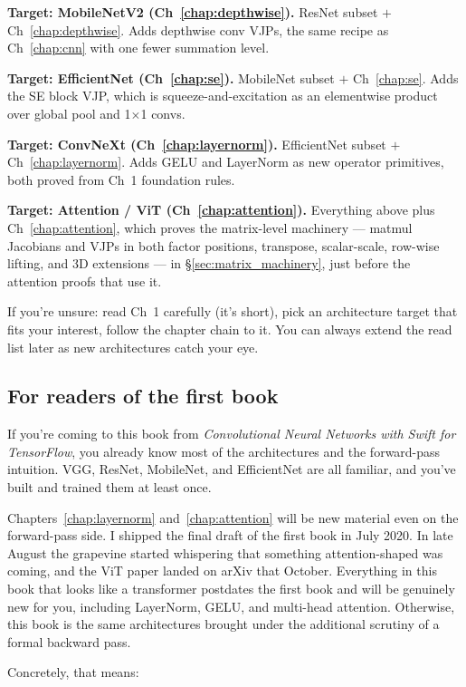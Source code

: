 \textbf{Target: MobileNetV2 (Ch~\ref{chap:depthwise}).} ResNet
subset $+$ Ch~\ref{chap:depthwise}. Adds depthwise conv VJPs, the same
recipe as Ch~\ref{chap:cnn} with one fewer summation level.

\textbf{Target: EfficientNet (Ch~\ref{chap:se}).} MobileNet subset
$+$ Ch~\ref{chap:se}. Adds the SE block VJP, which is
squeeze-and-excitation as an elementwise product over global pool and
1$\times$1 convs.

\textbf{Target: ConvNeXt (Ch~\ref{chap:layernorm}).} EfficientNet
subset $+$ Ch~\ref{chap:layernorm}. Adds GELU and LayerNorm as new
operator primitives, both proved from Ch~1 foundation rules.

\textbf{Target: Attention / ViT (Ch~\ref{chap:attention}).}
Everything above plus Ch~\ref{chap:attention}, which proves the
matrix-level machinery --- matmul Jacobians and VJPs in both factor
positions, transpose, scalar-scale, row-wise lifting, and 3D extensions
--- in \S\ref{sec:matrix_machinery}, just before the attention proofs
that use it.

If you're unsure: read Ch~1 carefully (it's short), pick an
architecture target that fits your interest, follow the chapter
chain to it. You can always extend the read list later as new
architectures catch your eye.

\subsection*{For readers of the first book}

If you're coming to this book from \emph{Convolutional Neural
Networks with Swift for TensorFlow}, you already know most of the
architectures and the forward-pass intuition. VGG, ResNet,
MobileNet, and EfficientNet are all familiar, and you've built and
trained them at least once.

Chapters~\ref{chap:layernorm} and~\ref{chap:attention} will be new
material even on the forward-pass side. I shipped the final draft
of the first book in July 2020. In late August the grapevine started
whispering that something attention-shaped was coming, and the ViT
paper landed on arXiv that October. Everything in this book that
looks like a transformer postdates the first book and will be genuinely
new for you, including LayerNorm, GELU, and multi-head attention.
Otherwise, this book is the same architectures brought under the
additional scrutiny of a formal backward pass.

Concretely, that means:

